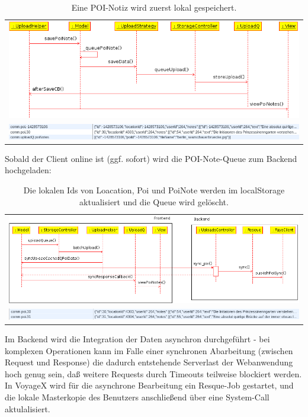 \begin{table}[H]
  \begin{adjustwidth}{-1cm}{1cm}
  \begin{center}
  \begin{tabulary}{\columnwidth}{ c }
  \includegraphics[scale=0.8]{bilder/uml/queuePoiNote.png} \\
  \includegraphics[scale=0.6]{bilder/screenshots/queue_localStrorage_1.png}
  \end{tabulary}
  \caption{Eine POI-Notiz wird zuerst lokal gespeichert.}
  \end{center}
  \end{adjustwidth}
\end{table}
\noindent
Sobald der Client online ist (ggf. sofort) wird die POI-Note-Queue zum Backend hochgeladen:
\begin{table}[H]
  \begin{adjustwidth}{-2cm}{2cm}
  \begin{center}
  \begin{tabulary}{\columnwidth}{ c }
  \includegraphics[scale=0.7]{bilder/uml/syncPoiNoteQueue.png} \\
  \includegraphics[scale=0.6]{bilder/screenshots/queue_localStrorage_2.png}
  \end{tabulary}
  \caption{Die lokalen Ids von Loacation, Poi und PoiNote werden im localStorage aktualisiert und die Queue wird gelöscht.}
  \end{center}
  \end{adjustwidth}
\end{table}
\noindent
Im Backend wird die Integration der Daten asynchron durchgeführt - bei komplexen Operationen kann im Falle einer synchronen Abarbeitung (zwischen Request und Response) die dadurch entstehende Serverlast der Webanwendung hoch genug sein, daß weitere Requests durch Timeouts teilweise blockiert werden. In VoyageX wird für die asynchrone Bearbeitung ein Resque-Job gestartet, und die lokale Masterkopie des Benutzers anschließend über eine System-Call aktulalisiert.

